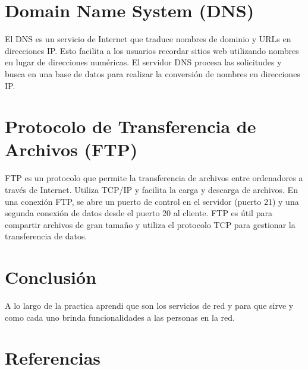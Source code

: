 \documentclass[11pt]{article}
\begin{document}
\section{Domain Name System (DNS)}
\label{sec:org784a6b9}
El DNS es un servicio de Internet que traduce nombres de dominio y
URLs en direcciones IP. Esto facilita a los usuarios recordar sitios
web utilizando nombres en lugar de direcciones numéricas. El servidor
DNS procesa las solicitudes y busca en una base de datos para realizar
la conversión de nombres en direcciones IP. 

\section{Protocolo de Transferencia de Archivos (FTP)}
\label{sec:org2879929}
FTP es un protocolo que permite la transferencia de archivos entre
ordenadores a través de Internet. Utiliza TCP/IP y facilita la carga y
descarga de archivos. En una conexión FTP, se abre un puerto de
control en el servidor (puerto 21) y una segunda conexión de datos
desde el puerto 20 al cliente. FTP es útil para compartir archivos de
gran tamaño y utiliza el protocolo TCP para gestionar la transferencia
de datos. 

\section{Conclusión}
\label{sec:org3dff412}
A lo largo de la practica aprendi que son los servicios de red y para
que sirve y como cada uno brinda funcionalidades a las personas en la red.

\section{Referencias}
\label{sec:org4433765}
\printbibliography[heading=none]
\end{document}
